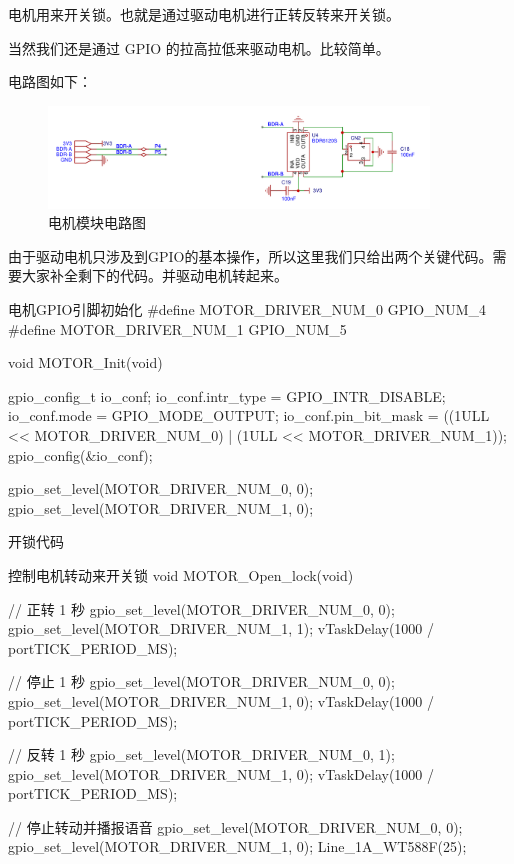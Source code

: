 \documentclass[lang=cn,newtx,10pt,scheme=chinese]{elegantbook}
\begin{document}
电机用来开关锁。也就是通过驱动电机进行正转反转来开关锁。

当然我们还是通过 GPIO 的拉高拉低来驱动电机。比较简单。

电路图如下：

\begin{figure}[!htb]
\centering
\includegraphics[width=0.9\textwidth]{motor.png}
\caption{电机模块电路图}
\end{figure}

由于驱动电机只涉及到GPIO的基本操作，所以这里我们只给出两个关键代码。需要大家补全剩下的代码。并驱动电机转起来。

\begin{mycode}{电机GPIO引脚初始化}
#define MOTOR_DRIVER_NUM_0 GPIO_NUM_4
#define MOTOR_DRIVER_NUM_1 GPIO_NUM_5

void MOTOR_Init(void)
{
    gpio_config_t io_conf;
    io_conf.intr_type = GPIO_INTR_DISABLE;
    io_conf.mode = GPIO_MODE_OUTPUT;
    io_conf.pin_bit_mask = ((1ULL << MOTOR_DRIVER_NUM_0) | (1ULL << MOTOR_DRIVER_NUM_1));
    gpio_config(&io_conf);

    gpio_set_level(MOTOR_DRIVER_NUM_0, 0);
    gpio_set_level(MOTOR_DRIVER_NUM_1, 0);
}
\end{mycode}

开锁代码

\begin{mycode}{控制电机转动来开关锁}
void MOTOR_Open_lock(void)
{
    // 正转 1 秒
    gpio_set_level(MOTOR_DRIVER_NUM_0, 0);
    gpio_set_level(MOTOR_DRIVER_NUM_1, 1);
    vTaskDelay(1000 / portTICK_PERIOD_MS);

    // 停止 1 秒
    gpio_set_level(MOTOR_DRIVER_NUM_0, 0);
    gpio_set_level(MOTOR_DRIVER_NUM_1, 0);
    vTaskDelay(1000 / portTICK_PERIOD_MS);

    // 反转 1 秒
    gpio_set_level(MOTOR_DRIVER_NUM_0, 1);
    gpio_set_level(MOTOR_DRIVER_NUM_1, 0);
    vTaskDelay(1000 / portTICK_PERIOD_MS);

    // 停止转动并播报语音
    gpio_set_level(MOTOR_DRIVER_NUM_0, 0);
    gpio_set_level(MOTOR_DRIVER_NUM_1, 0);
    Line_1A_WT588F(25);
}
\end{mycode}
\end{document}
